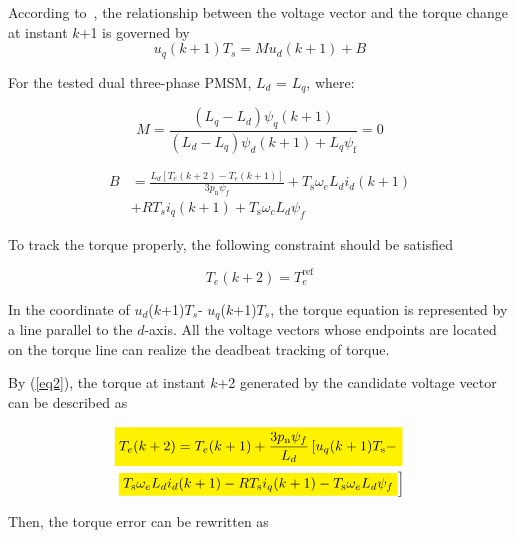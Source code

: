\documentclass[sn-basic]{sn-jnl}
\newcommand{\mathcolorbox}[2]{\colorbox{#1}{$\displaystyle #2$}}
\theoremstyle{thmstyleone}%
\theoremstyle{thmstyletwo}%
\theoremstyle{thmstylethree}%
\theoremstyle{thmstyleone}%
\begin{document}
According to~\cite{5316082}, the relationship between the voltage vector and the torque change at instant $k$+1 is governed by
\begin{equation}\label{eq2}
u_{q}(k + 1)T_{s} = Mu_{d}(k + 1) + B
\end{equation}

For the tested dual three-phase PMSM,  $L_d$ =  $L_q$, where:

\begin{equation}\label{1111}
M=\frac{\left(L_q-L_d\right) \psi_q(k+1)}{\left(L_d-L_q\right) \psi_d(k+1)+L_q \psi_{\mathrm{f}}}=0
\end{equation}

\begin{equation}\label{eq33}
\begin{aligned}
B &=\frac{L_{d}\left[T_{e}(k+2)-T_{e}(k+1)\right]}{3 p_{\mathrm{n}} \psi_{f}}+T_{\mathrm{s}} \omega_{e} L_{d} i_{d}(k+1)\\ 
 &+R T_{s} i_{q}(k+1)+T_{\mathrm{s}} \omega_{c} L_{d} \psi_{f}
\end{aligned}
\end{equation}


To track the torque properly, the following constraint should be satisfied

\begin{equation}
T_{e}\left( {k + 2} \right) = T_{e}^{\text{ref}}
\end{equation}


In the coordinate of $u_d$($k$+1)$T_s$-\!\! $u_q$($k$+1)$T_s$, the torque equation is represented by a line parallel to the $d$-axis. All the voltage vectors whose endpoints are located on the torque line can realize the deadbeat tracking of torque.


By (\ref{eq2}), the torque at instant $k$+2 generated by the candidate voltage vector can be described as


\begin{equation}
\begin{aligned}
&\mathcolorbox{yellow}{ T_e(k+2)=T_e(k+1)+\frac{3 p_{\mathrm{n}} \psi_f}{L_d}\left[u_q(k+1) T_{\mathrm{s}}-\right.} \\
&\left.\mathcolorbox{yellow}{ T_{\mathrm{s}} \omega_e L_d i_d(k+1)-R T_{\mathrm{s}} i_q(k+1)-T_{\mathrm{s}} \omega_e L_d \psi_f}\right]
\end{aligned}
\end{equation}

Then, the torque error can be rewritten as
\end{document}
